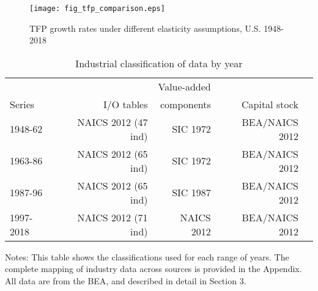\documentclass[11pt]{article}
\begin{document}
\begin{figure}[!htb]
\begin{center}
\caption{TFP growth rates under different elasticity assumptions, U.S. 1948-2018}
\label{FIG_tfp_comparison}
\texttt{[image: fig\_tfp\_comparison.eps]}
\end{center}
\vspace{-.5cm}
\end{figure}

\clearpage

\begin{table}[!htb]
\begin{center}
\label{TAB_series}
\caption{Industrial classification of data by year}
\begin{tabular}{lrrrr}
\midrule
	    &             & Value-added   & \\
Series  & I/O tables  & components & Capital stock \\ 
\midrule
1948-62 & NAICS 2012 (47 ind) & SIC 1972 & BEA/NAICS 2012 \\
1963-86 & NAICS 2012 (65 ind) & SIC 1972 & BEA/NAICS 2012 \\
1987-96 & NAICS 2012 (65 ind) & SIC 1987 & BEA/NAICS 2012 \\
1997-2018 & NAICS 2012 (71 ind) & NAICS 2012 & BEA/NAICS 2012 \\ 
\midrule
\end{tabular}
\end{center}
{\footnotesize Notes: This table shows the classifications used for each range of years. The complete mapping of industry data across sources is provided in the Appendix. All data are from the BEA, and described in detail in Section 3.}
\end{table}

\clearpage
\end{document}
